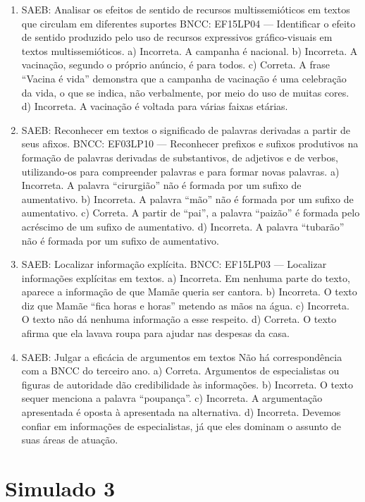 \begin{enumerate}
\item
SAEB: Analisar os efeitos de sentido de recursos multissemióticos em textos que circulam em diferentes suportes BNCC: EF15LP04 --- Identificar o efeito de sentido produzido pelo uso de recursos expressivos gráfico-visuais em textos multissemióticos. a) Incorreta. A campanha é nacional. b) Incorreta. A vacinação, segundo o próprio anúncio, é para todos. c) Correta. A frase ``Vacina é vida'' demonstra que a campanha de vacinação é uma celebração da vida, o que se indica, não verbalmente, por meio do uso de muitas cores. d) Incorreta. A vacinação é voltada para várias faixas etárias.

\item
SAEB: Reconhecer em textos o significado de palavras derivadas a partir de seus afixos. BNCC: EF03LP10 --- Reconhecer prefixos e sufixos produtivos na formação de palavras derivadas de substantivos, de adjetivos e de verbos, utilizando-os para compreender palavras e para formar novas palavras. a) Incorreta. A palavra ``cirurgião'' não é formada por um sufixo de aumentativo. b) Incorreta. A palavra ``mão'' não é formada por um sufixo de aumentativo. c) Correta. A partir de ``pai'', a palavra ``paizão'' é formada pelo acréscimo de um sufixo de aumentativo. d) Incorreta. A palavra ``tubarão'' não é formada por um sufixo de aumentativo.

\item
SAEB: Localizar informação explícita. BNCC: EF15LP03 --- Localizar informações explícitas em textos. a) Incorreta. Em nenhuma parte do texto, aparece a informação de que Mamãe queria ser cantora. b) Incorreta. O texto diz que Mamãe ``fica horas e horas'' metendo as mãos na água. c) Incorreta. O texto não dá nenhuma informação a esse respeito. d) Correta. O texto afirma que ela lavava roupa para ajudar nas despesas da casa.

\item
SAEB: Julgar a eficácia de argumentos em textos Não há correspondência com a BNCC do terceiro ano. a) Correta. Argumentos de especialistas ou figuras de autoridade dão credibilidade às informações. b) Incorreta. O texto sequer menciona a palavra ``poupança''. c) Incorreta. A argumentação apresentada é oposta à apresentada na alternativa. d) Incorreta. Devemos confiar em informações de especialistas, já que eles dominam o assunto de suas áreas de atuação.
\end{enumerate}

\section*{Simulado 3}

